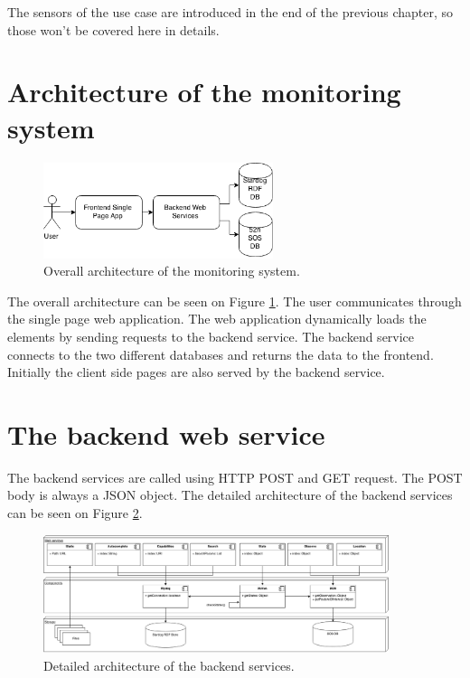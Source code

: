 The sensors of the use case are introduced in the end of the previous chapter, so those won't be covered here in details.
  
\section{Architecture of the monitoring system}

\begin{figure}[h]
\centering
\includegraphics[width=0.6\textwidth]{figures/softwareArch.png}
\caption{Overall architecture of the monitoring system.\label{fig:overallarch}}
\end{figure}

The overall architecture can be seen on Figure \ref{fig:overallarch}. The user communicates through the single page web application. The web application dynamically loads the elements by sending requests to the backend service. The backend service connects to the two different databases and returns the data to the frontend. Initially the client side pages are also served by the backend service. 

\section{The backend web service}

The backend services are called using HTTP POST and GET request. The POST body is always a JSON object. The detailed architecture of the backend services can be seen on Figure \ref{fig:backarch}.


\begin{figure}[h]
\centering
\includegraphics[width=0.9\textwidth]{figures/backendarch.png}
\caption{Detailed architecture of the backend services.\label{fig:backarch}}
\end{figure}

